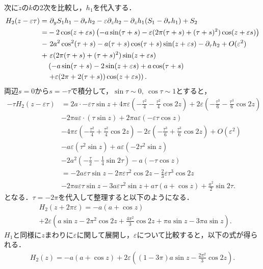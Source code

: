 \documentclass[../main]{subfiles}
\begin{document}
    次に$\dot{z}$の$k$の2次を比較し，$h_1$を代入する．
    \begin{align*}
        H_2(z-\varepsilon \tau)=&\ \partial_y S_1h_1 -\partial_\tau h_2-\varepsilon\partial_zh_2 -\partial_zh_1(S_1-\partial_\tau h_1)+S_2\\
        =&-2\cos (z+\varepsilon s)\left( -a\sin(\tau+s)-\varepsilon(2\pi (\tau+s)+(\tau+s)^2) \cos (z+\varepsilon s) \right)\\
        -&\ 2a^2\cos^2(\tau+s)-a(\tau+s)\cos (\tau+s)\sin (z+\varepsilon s)-\partial_\tau h_2+O(\varepsilon^2)\\
        +&\ \varepsilon(2\pi(\tau+s)+(\tau+s)^2)\sin (z+\varepsilon s) \\
        &\left( -a\sin(\tau+s)-2\sin (z+\varepsilon s) +a\cos(\tau+s)\right.\\
        &\left.+\varepsilon(2\pi +2(\tau+s))\cos (z+\varepsilon s)\right).
    \end{align*}
    両辺$s=0$から$s=-\tau$で積分して，$\sin\tau\sim 0,\ \cos\tau\sim 1$とすると，
    \begin{align*}
        -\tau H_2(z-\varepsilon \tau)&=2a\cdot -\varepsilon \tau\sin z+4\pi\varepsilon\left( -\frac{\tau^2}{4} -\frac{\tau^2}{4}\cos 2z\right)+2\varepsilon\left( -\frac{\tau^3}{6} -\frac{\tau^3}{6}\cos 2 z\right)\\
        &-2\pi a\varepsilon\cdot\left(\tau\sin z\right)+2\pi a\varepsilon\left(-\varepsilon \tau\cos z\right)\\
        &-4\pi\varepsilon\left(-\frac{\tau^2}{4}+\frac{\tau^2}{4}\cos 2 z\right)-2\varepsilon\left( -\frac{\tau^3}{6} +\frac{\tau^3}{6}\cos 2z\right)+O(\varepsilon^2)\\
        &-a\varepsilon\left( \tau^2\sin z \right)+a\varepsilon\left( -2\tau^2\sin z \right)\\
        &-2a^2\left( -\frac{\tau}{2}-\frac{1}{4} \sin 2\tau\right)-a\left( -\tau \cos z\right)\\
        &=-2a\varepsilon \tau\sin z-2\pi\varepsilon\tau^2\cos 2 z-\frac{2}{3}\varepsilon\tau^3\cos 2z\\
        &-2\pi a\varepsilon \tau\sin z-3a\varepsilon\tau^2\sin z+a\tau(a+\cos z)+\frac{a^2}{2}\sin 2\tau.
    \end{align*}
    となる．$\tau=-2\pi$を代入して整理すると以下のようになる．
    \begin{align*}
        &H_2(z+2\pi\varepsilon )=-a(a+\cos z)\\
        &+2\varepsilon\left( a\sin z-2\pi^2\cos2 z+\frac{4\pi^2}{3} \cos 2 z+\pi a\sin z-3\pi a\sin z\right).
    \end{align*}
    $H_1$と同様に$z$まわりに$\varepsilon$に関して展開し，$\varepsilon$について比較すると，以下の式が得られる．
    \begin{align}
        \label{eq:nit-H2}
        H_2(z)=-a(a+\cos z)+2\varepsilon\left( (1-3\pi)a\sin z-\frac{2\pi^2}{3} \cos 2 z\right).
    \end{align}
\end{document}
